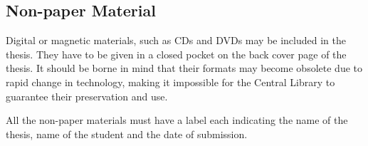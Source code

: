\subsection{Non-paper Material}
Digital or magnetic materials, such as CDs and DVDs may be included in the thesis. They have to be given in a closed pocket on the back cover page of the thesis. It should be borne in mind that their formats may become obsolete due to rapid change in technology, making it impossible for the Central Library to guarantee their preservation and use.
\par All the non-paper materials must have a label each indicating the name of the thesis, name of the student and the date of submission.

